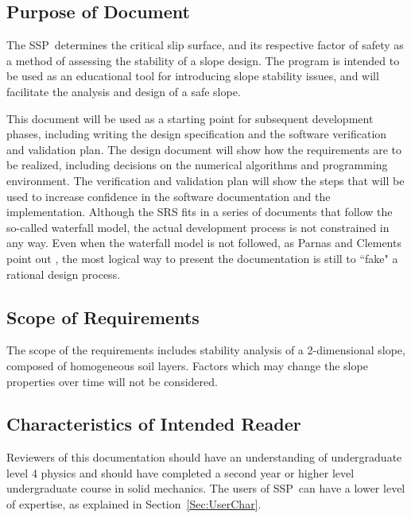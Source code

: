 \documentclass[12pt]{article}
\newcommand{\progname}{SSP}
\begin{document}
\subsection{Purpose of Document}

The \progname\ determines the critical slip surface, and its respective factor 
of safety
 as a method of assessing the stability of a slope design. The program is 
 intended to
 be used as an educational tool for introducing slope stability issues, and will
 facilitate the analysis and design of a safe slope.
 

This document will be used as a starting point for subsequent development 
phases, including writing the design specification and the software verification
 and validation plan. The design document will show how the requirements
 are to be realized, including decisions on the numerical algorithms and 
programming environment. The verification and validation plan will show
 the steps that will be used to increase confidence in the software 
 documentation
 and the implementation. Although the SRS fits in a series of documents 
that follow the so-called waterfall model, the actual development process
 is not constrained in any way. Even when the waterfall model is not followed, 
as Parnas and Clements point out \cite{ParnasAndClements1986}, the most logical 
way to present the documentation is still to ``fake" a rational design process.

\subsection{Scope of Requirements} 

The scope of the requirements includes stability analysis of a 2-dimensional 
slope, composed of homogeneous soil layers. Factors which may change the slope 
properties over time will not be considered.

\subsection{Characteristics of Intended Reader}
\label{Sec:CharofInteRead}
Reviewers of this documentation should have an understanding of undergraduate 
level 4 physics and should have completed a second year or higher level 
undergraduate course in solid mechanics. The users of \progname\ can have a 
lower level of expertise, as explained in Section~\ref{Sec:UserChar}.
\end{document}
